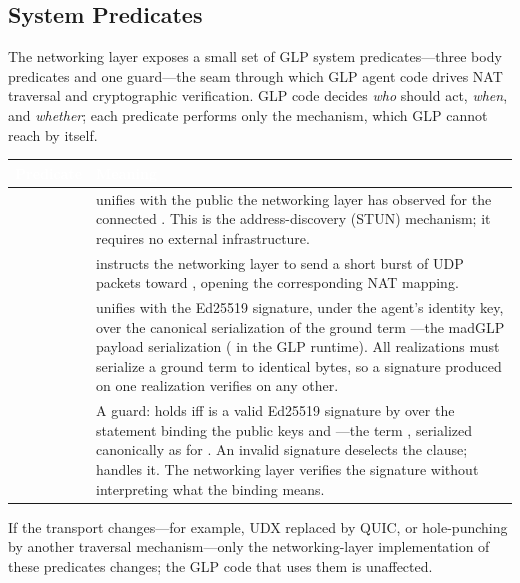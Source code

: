 \subsection{System Predicates}
\label{sec:system-predicates}
The networking layer exposes a small set of GLP system predicates---three body predicates and one guard---the seam through which GLP agent code drives NAT traversal and cryptographic verification.  GLP code decides \emph{who} should act, \emph{when}, and \emph{whether}; each predicate performs only the mechanism, which GLP cannot reach by itself.
\begin{longtable}{L{4.2cm} L{9.3cm}}
\toprule
{}
\textcolor{white}{\textbf{Predicate}} &
\textcolor{white}{\textbf{Meaning}} \\
\midrule
\endhead
{} &  unifies  with the public  the networking layer has observed for the connected .  This is the address-discovery (STUN) mechanism; it requires no external infrastructure. \\
 &  instructs the networking layer to send a short burst of UDP packets toward , opening the corresponding NAT mapping. \\
 &  unifies  with the Ed25519 signature, under the agent's identity key, over the canonical serialization of the ground term ---the madGLP payload serialization ( in the GLP runtime).  All realizations must serialize a ground term to identical bytes, so a signature produced on one realization verifies on any other. \\
 & A guard:  holds iff  is a valid Ed25519 signature by  over the statement binding the public keys  and ---the term , serialized canonically as for .  An invalid signature deselects the clause;  handles it.  The networking layer verifies the signature without interpreting what the binding means. \\
\bottomrule
\end{longtable}
If the transport changes---for example, UDX replaced by QUIC, or hole-punching by another traversal mechanism---only the networking-layer implementation of these predicates changes; the GLP code that uses them is unaffected.

